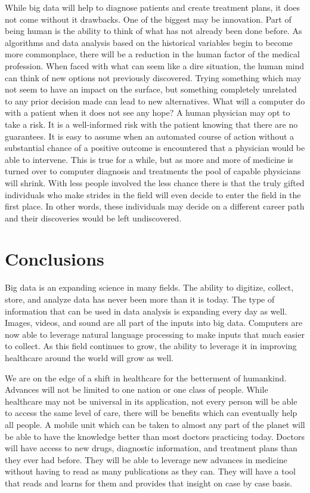 \documentclass[sigconf]{acmart}
\begin{document}
While big data will help to diagnose patients and create treatment 
plans, it does not come without it drawbacks.  One of the biggest may 
be innovation.  Part of being human is the ability to think of what 
has not already been done before.  As algorithms and data analysis 
based on the historical variables begin to become more commonplace, 
there will be a reduction in the human factor of the medical 
profession.  When faced with what can seem like a dire situation, the 
human mind can think of new options not previously discovered.  
Trying something which may not seem to have an impact on the surface, 
but something completely unrelated to any prior decision made can lead 
to new alternatives.  What will a computer do with a patient when it 
does not see any hope?  A human physician may opt to take a risk.  
It is a well-informed risk with the patient knowing that there are no 
guarantees.  It is easy to assume when an automated course of action 
without a substantial chance of a positive outcome is encountered that 
a physician would be able to intervene.  This is true for a while, 
but as more and more of medicine is turned over to computer diagnosis 
and treatments the pool of capable physicians will shrink.  With less 
people involved the less chance there is that the truly gifted 
individuals who make strides in the field will even decide to enter 
the field in the first place.  In other words, these individuals may 
decide on a different career path and their discoveries would be left 
undiscovered.  

\section{Conclusions}
Big data is an expanding science in many fields.  The ability to 
digitize, collect, store, and analyze data has never been more than 
it is today.  The type of information that can be used in data analysis 
is expanding every day as well.  Images, videos, and sound are all 
part of the inputs into big data.  Computers are now able to leverage 
natural language processing to make inputs that much easier to collect.  
As this field continues to grow, the ability to leverage it in 
improving healthcare around the world will grow as well.

We are on the edge of a shift in healthcare for the betterment of 
humankind.  Advances will not be limited to one nation or one class of 
people.  While healthcare may not be universal in its application, not 
every person will be able to access the same level of care, there will 
be benefits which can eventually help all people.  A mobile unit which 
can be taken to almost any part of the planet will be able to have the 
knowledge better than most doctors practicing today.  Doctors will have 
access to new drugs, diagnostic information, and treatment plans than 
they ever had before.  They will be able to leverage new advances in 
medicine without having to read as many publications as they can.  They 
will have a tool that reads and learns for them and provides that 
insight on case by case basis.
\end{document}
